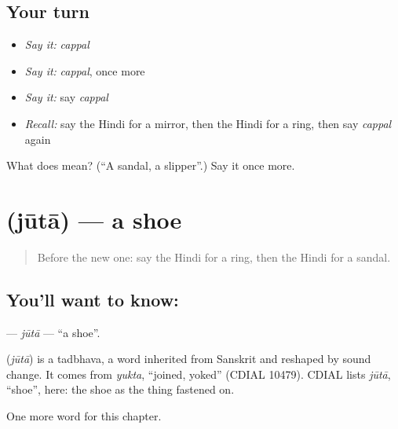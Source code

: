 \subsection*{Your turn}
\begin{itemize}
\raggedright
  \item \emph{Say it:} \emph{cappal}
  \item \emph{Say it:} \emph{cappal}, once more
  \item \emph{Say it:} say \emph{cappal}
  \item \emph{Recall:} say the Hindi for a mirror, then the Hindi for a ring, then say \emph{cappal} again
\end{itemize}

\begin{tcolorbox}[breakable,colback=teal!4,colframe=teal!35!black,title={Before you move on}]
What does  mean? (\textquotedblleft{}A sandal, a slipper\textquotedblright{}.) Say it once more.
\end{tcolorbox}
\section[\texorpdfstring{\hi{जूता} (jūtā)}{जूता (jūtā)}]{ (jūtā) — a shoe}

\label{lesson:HI-C135-juta}



\begin{quote}
Before the new one: say the Hindi for a ring, then the Hindi for a sandal.
\end{quote}

\subsection*{You'll want to know: }
\textbf{} — \emph{jūtā} — \textquotedblleft{}a shoe\textquotedblright{}.

\begin{cousinweb}
\textbf{} (\emph{jūtā}) is a tadbhava, a word inherited from Sanskrit and reshaped by sound change. It comes from \emph{yukta}, \textquotedblleft{}joined, yoked\textquotedblright{} (CDIAL 10479). CDIAL lists \emph{jūtā}, \textquotedblleft{}shoe\textquotedblright{}, here: the shoe as the thing fastened on.
\end{cousinweb}

\begin{grammarlens}[title={What you've built}]
One more word for this chapter.
\end{grammarlens}

